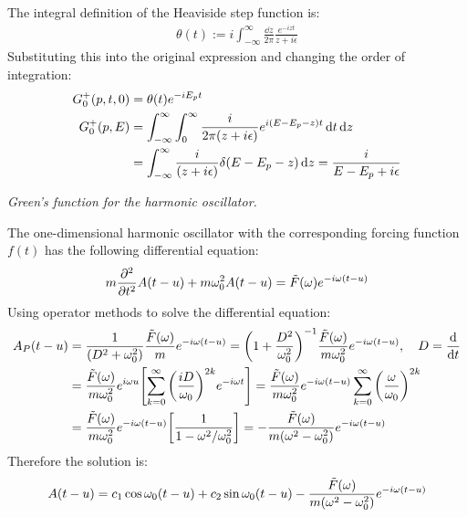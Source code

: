 \documentclass{report}
\begin{document}
\begin{subquests}
\begin{subquests}
		\item The integral definition of the Heaviside step function is:
		\begin{gather*}
			\theta(t) := i\int_{-\infty}^{\infty}\frac{\dd z}{2\pi}\frac{e^{-izt}}{z+i\epsilon}
		\end{gather*}
		Substituting this into the original expression and changing the order of integration:
		\begin{align*}
			G^+_0(p,t,0) & = \theta(t)e^{-iE_p t} \\
			G^+_0(p,E) & = \int_{-\infty}^{\infty}\int_{0}^{\infty}\frac{i}{2\pi\pqty{z+i\epsilon}}e^{i\pqty{E - E_p - z}t} \dd{t}\dd{z} \\
			& = \int_{-\infty}^{\infty}\frac{i}{\pqty{z+i\epsilon}}\delta{\pqty{E - E_p - z}} \dd{z} = \frac{i}{E - E_p + i\epsilon}
		\end{align*}
	\end{subquests}
	\newpage
	\item \emph{Green's function for the harmonic oscillator.}
	\begin{subquests}
		\item The one-dimensional harmonic oscillator with the corresponding forcing function $f(t)$ has the following differential equation:
		\begin{gather*}
			m\pdv[2]{t}A(t-u) + m\omega_0^2A(t-u) = \tilde F(\omega)e^{-i\omega(t-u)}
		\end{gather*}
		Using operator methods to solve the differential equation:
		\begin{align*}
			A_P(t-u) & = \frac{1}{\pqty{D^2 + \omega_0^2}}\frac{\tilde F(\omega)}{m}e^{-i\omega(t-u)} = \pqty{1 + \frac{D^2}{\omega_0^2}}^{-1}\frac{\tilde F(\omega)}{m\omega_0^2}e^{-i\omega(t-u)}, \quad D = \dv{t} \\
			& = \frac{\tilde F(\omega)}{m\omega_0^2}e^{i\omega u}\bqty{\sum_{k=0}^{\infty} \pqty{\frac{iD}{\omega_0}}^{2k}e^{-i\omega t}} = \frac{\tilde F(\omega)}{m\omega_0^2}e^{-i\omega(t-u)}\sum_{k=0}^{\infty}\pqty{\frac{\omega}{\omega_0}}^{2k}\\
			& = \frac{\tilde F(\omega)}{m\omega_0^2}e^{-i\omega(t-u)}\bqty{\frac{1}{1-\omega^2/\omega_0^2}} = -\frac{\tilde F(\omega)}{m\pqty{\omega^2 - \omega_0^2}}e^{-i\omega(t-u)} 
		\end{align*}
		Therefore the solution is:
		\begin{gather*}
			A(t-u) = c_1 \cos\omega_0(t-u) + c_2 \sin\omega_0(t-u) - \frac{\tilde F(\omega)}{m\pqty{\omega^2 - \omega_0^2}}e^{-i\omega(t-u)} 
		\end{gather*}


\end{subquests}
\end{subquests}
\end{document}
